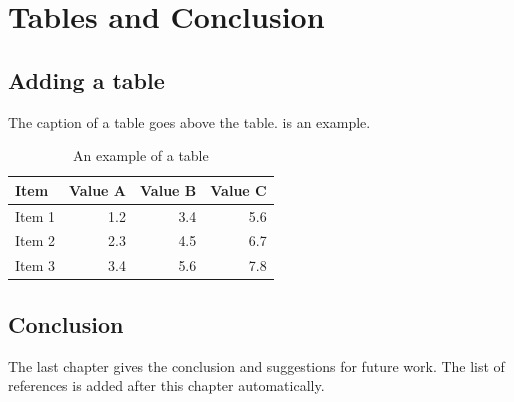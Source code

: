 \chapter{Tables and Conclusion}\label{chap:result}

\section{Adding a table}
The caption of a table goes above the table.
 is an example.

\begin{table}[htbp]
  \centering
  \caption{An example of a table}\label{tab:sample}
  \begin{tabular}{lrrr}
    \hline
    Item   & Value A & Value B & Value C \\
    \hline
    Item 1 & 1.2 & 3.4 & 5.6 \\
    Item 2 & 2.3 & 4.5 & 6.7 \\
    Item 3 & 3.4 & 5.6 & 7.8 \\
    \hline
  \end{tabular}
\end{table}

\section{Conclusion}
The last chapter gives the conclusion and suggestions for future work.
The list of references is added after this chapter automatically.
